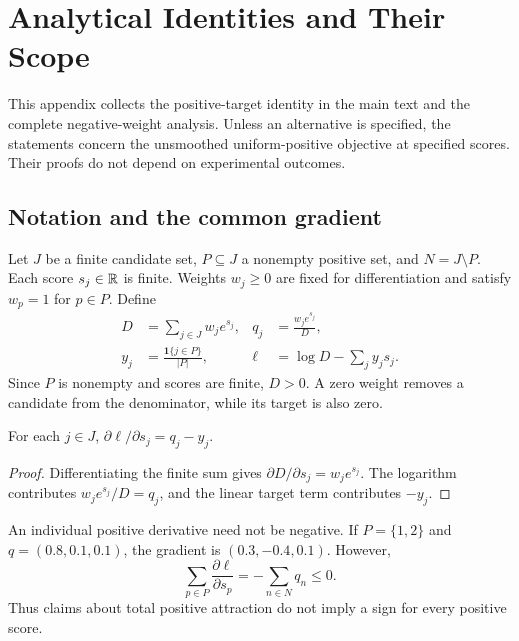 \section{Analytical Identities and Their Scope}
\label{app:math}
This appendix collects the positive-target identity in the main text and the complete negative-weight analysis. Unless an alternative is specified, the statements concern the unsmoothed uniform-positive objective at specified scores. Their proofs do not depend on experimental outcomes.

\subsection{Notation and the common gradient}
Let $J$ be a finite candidate set, $P\subseteq J$ a nonempty positive set, and $N=J\setminus P$. Each score $s_j\in\mathbb{R}$ is finite. Weights $w_j\geq0$ are fixed for differentiation and satisfy $w_p=1$ for $p\in P$. Define
\begin{align}
D&=\sum_{j\in J}w_je^{s_j},& q_j&=\frac{w_je^{s_j}}{D},\\
y_j&=\frac{\mathbf1\{j\in P\}}{|P|},& \ell&=\log D-\sum_jy_js_j.
\end{align}
Since $P$ is nonempty and scores are finite, $D>0$. A zero weight removes a candidate from the denominator, while its target is also zero.

\begin{lemma}
For each $j\in J$, $\partial\ell/\partial s_j=q_j-y_j$.
\end{lemma}
\begin{proof}
Differentiating the finite sum gives $\partial D/\partial s_j=w_je^{s_j}$. The logarithm contributes $w_je^{s_j}/D=q_j$, and the linear target term contributes $-y_j$.
\end{proof}
An individual positive derivative need not be negative. If $P=\{1,2\}$ and $q=(0.8,0.1,0.1)$, the gradient is $(0.3,-0.4,0.1)$. However,
\begin{equation}
\sum_{p\in P}\frac{\partial\ell}{\partial s_p}=-\sum_{n\in N}q_n\leq0.
\end{equation}
Thus claims about total positive attraction do not imply a sign for every positive score.

